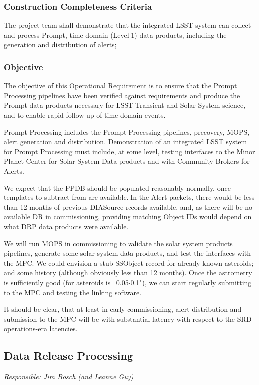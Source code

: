 \subsubsection{Construction Completeness Criteria}
The project team shall demonstrate that the integrated LSST system can collect and process Prompt, time-domain (Level 1) data products, including the generation and distribution of alerts;

\subsubsection{Objective} 

The objective of this Operational Requirement is to ensure that the Prompt Processing pipelines have been verified against requirements and produce the Prompt data products necessary for LSST Transient and Solar System science, and to enable rapid follow-up of time domain events. 

Prompt Processing includes the Prompt Processing pipelines, precovery, MOPS, alert generation and distribution. Demonstration of an integrated LSST system for Prompt Processing must include, at some level, testing interfaces to the Minor Planet Center for Solar System Data products and with Community Brokers for Alerts. 

We expect that the PPDB should be populated reasonably normally, once templates to subtract from are available.  In the Alert packets, there would be less than 12 months of previous DIASource records available, and, as there will be no available DR in commissioning, providing matching Object IDs would depend on what DRP data products were available. 

We will run MOPS in commissioning to validate the solar system products pipelines, generate some solar system data products, and test the interfaces with the MPC. We could envision a stub SSObject record for already known asteroids; and some history (although obviously less than 12 months). Once the astrometry is sufficiently good (for asteroids is ~0.05-0.1"),  we can start regularly submitting to the MPC and testing the linking software. 

It should be clear, that at least in early commissioning, alert distribution and submission to the MPC  will be with substantial latency with respect to the SRD operations-era latencies.  



\subsection{Data Release Processing}
{\it Responsible: Jim Bosch (and Leanne Guy)}

